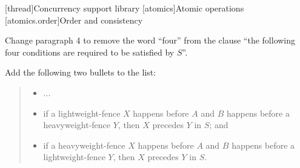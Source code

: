

\setcounter{chapter}{32}
[thread]{Concurrency support library}
\setcounter{section}{4}
[atomics]{Atomic operations}
\setcounter{subsection}{3}
[atomics.order]{Order and consistency}

Change  paragraph 4 to remove the word ``four'' from
the clause ``the following four conditions are required to be satisfied
by $S$''.

Add the following two bullets to the list:
\begin{quote}
\pnum
\begin{itemize}
\item
  ...
\item
if a  lightweight-fence $X$ happens before $A$ and $B$ happens
before a  heavyweight-fence $Y$, then $X$ precedes $Y$ in $S$; and
\item  if a  heavyweight-fence $X$ happens before $A$ and $B$ happens
before a  lightweight-fence $Y$, then $X$ precedes $Y$ in $S$.
\end{itemize}
\end{quote}
